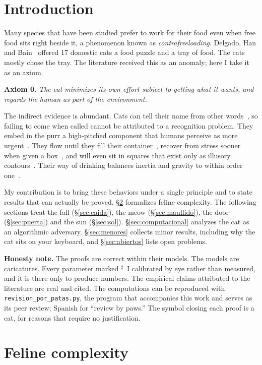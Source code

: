 \documentclass[11pt,a4paper]{article}
\theoremstyle{plain}
\theoremstyle{definition}
\theoremstyle{remark}
\numberwithin{equation}{section}
\newcommand{\calib}{{\ensuremath{^{\ddagger}}}}
\begin{document}
\section{Introduction}

Many species that have been studied prefer to work for their food even when free food sits right beside it, a phenomenon known as \emph{contrafreeloading}. Delgado, Han and Bain~\cite{delgado} offered 17 domestic cats a food puzzle and a tray of food. The cats mostly chose the tray. The literature received this as an anomaly; here I take it as an axiom.

\medskip
\noindent\textbf{Axiom 0.} \emph{The cat minimizes its own effort subject to getting what it wants, and regards the human as part of the environment.}

\medskip
The indirect evidence is abundant. Cats can tell their name from other words~\cite{saito}, so failing to come when called cannot be attributed to a recognition problem. They embed in the purr a high-pitched component that humans perceive as more urgent~\cite{mccomb}. They flow until they fill their container~\cite{fardin}, recover from stress sooner when given a box~\cite{vinke}, and will even sit in squares that exist only as illusory contours~\cite{smith}. Their way of drinking balances inertia and gravity to within order one~\cite{reis}.

My contribution is to bring these behaviors under a single principle and to state results that can actually be proved. \S\ref{sec:complejidad} formalizes feline complexity. The following sections treat the fall (\S\ref{sec:caida}), the meow (\S\ref{sec:maullido}), the door (\S\ref{sec:puerta}) and the sun (\S\ref{sec:sol}). \S\ref{sec:computacional} analyzes the cat as an algorithmic adversary. \S\ref{sec:menores} collects minor results, including why the cat sits on your keyboard, and \S\ref{sec:abiertos} lists open problems.

\medskip
\noindent\textbf{Honesty note.} The proofs are correct within their models. The models are caricatures. Every parameter marked \calib\ I calibrated by eye rather than measured, and it is there only to produce numbers. The empirical claims attributed to the literature are real and cited. The computations can be reproduced with \texttt{revision\_por\_patas.py}, the program that accompanies this work and serves as its peer review; Spanish for ``review by paws.'' The symbol closing each proof is a cat, for reasons that require no justification.

\section{Feline complexity}\label{sec:complejidad}
\end{document}
